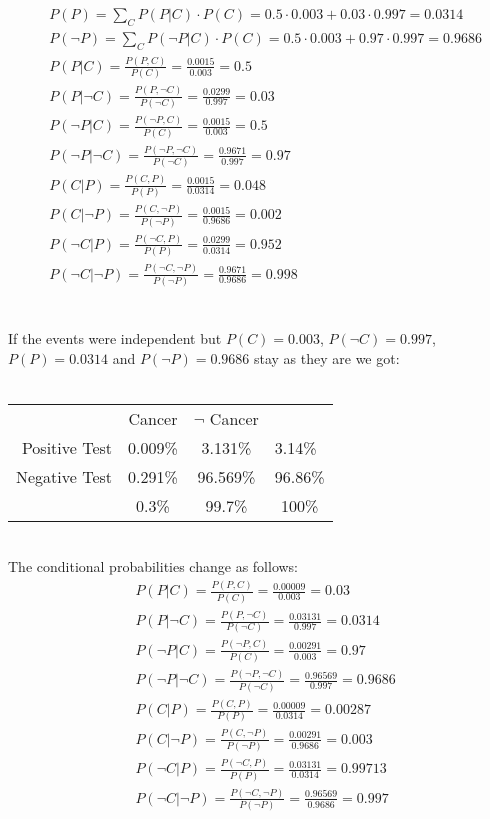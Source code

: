 \documentclass{article}
\begin{document}
\begin{align}
& P(P) = \sum_{C}{P(P|C) \cdot P(C)} = 0.5 \cdot 0.003 + 0.03 \cdot 0.997 = 0.0314\\
& P(\neg P) = \sum_{C}{P(\neg P|C) \cdot P(C)} = 0.5 \cdot 0.003 + 0.97 \cdot 0.997 = 0.9686\\ 
& P(P|C) = \frac{P(P,C)}{P(C)} = \frac{0.0015}{0.003} = 0.5 \\
& P(P|\neg C) = \frac{P(P,\neg C)}{P(\neg C)} = \frac{0.0299}{0.997} = 0.03 \\
& P(\neg P|C) = \frac{P(\neg P,C)}{P(C)} = \frac{0.0015}{0.003} = 0.5 \\
& P(\neg P|\neg C) = \frac{P(\neg P,\neg C)}{P(\neg C)} = \frac{0.9671}{0.997}= 0.97\\
& P(C|P) = \frac{P(C,P)}{P(P)} = \frac{0.0015}{0.0314} = 0.048 \\
& P(C|\neg P) = \frac{P(C,\neg P)}{P(\neg P)} = \frac{0.0015}{0.9686} = 0.002 \\
& P(\neg C|P) = \frac{P(\neg C,P)}{P(P)} = \frac{0.0299}{0.0314} = 0.952 \\
& P(\neg C|\neg P) = \frac{P(\neg C,\neg P)}{P(\neg P)} = \frac{0.9671}{0.9686}= 0.998 
\end{align}\\
\\
If the events were independent but $P(C)=0.003$, $P(\neg C)=0.997$, $P(P)=0.0314$ and $P(\neg P)=0.9686$ stay as they are we got:
\\
\\
\begin{tabular}{ r|c|c|l }
\multicolumn{1}{r}{}
 &  \multicolumn{1}{c}{Cancer}
 & \multicolumn{1}{c}{$\neg$ Cancer} \\
\cline{2-3}
Positive Test & 0.009\% & 3.131\% & 3.14\%\\ 
\cline{2-3}
Negative Test & 0.291\% & 96.569\% & 96.86\% \\
\cline{2-3}
\multicolumn{1}{r}{}
 &  \multicolumn{1}{c}{0.3\%}
 & \multicolumn{1}{c}{99.7\%}  & \multicolumn{1}{c}{100\%}\\
\end{tabular}\\
\newpage
The conditional probabilities change as follows:\\
\begin{align}
& P(P|C) = \frac{P(P,C)}{P(C)} = \frac{0.00009}{0.003} = 0.03 \\
& P(P|\neg C) = \frac{P(P,\neg C)}{P(\neg C)} = \frac{0.03131}{0.997} = 0.0314 \\
& P(\neg P|C) = \frac{P(\neg P,C)}{P(C)} = \frac{0.00291}{0.003} = 0.97 \\
& P(\neg P|\neg C) = \frac{P(\neg P,\neg C)}{P(\neg C)} = \frac{0.96569}{0.997}= 0.9686\\
& P(C|P) = \frac{P(C,P)}{P(P)} = \frac{0.00009}{0.0314} = 0.00287 \\
& P(C|\neg P) = \frac{P(C,\neg P)}{P(\neg P)} = \frac{0.00291}{0.9686} = 0.003 \\
& P(\neg C|P) = \frac{P(\neg C,P)}{P(P)} = \frac{0.03131}{0.0314} = 0.99713 \\
& P(\neg C|\neg P) = \frac{P(\neg C,\neg P)}{P(\neg P)} = \frac{0.96569}{0.9686}= 0.997 
\end{align}
\end{document}
